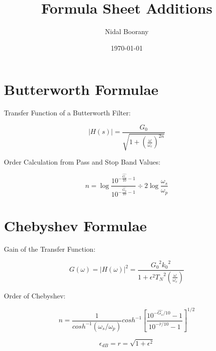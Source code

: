 \documentclass{article}
\begin{document}
\title{Formula Sheet Additions}
\author{Nidal Boorany}
\date{\today}
\maketitle

\section{Butterworth Formulae}
Transfer Function of a Butterworth Filter:

$$|H(s)| = \frac{G_0}{\sqrt{1 + (\frac{\omega}{\omega_c})^{2n}}}$$

Order Calculation from Pass and Stop Band Values:

$$n = \log{\frac{10^{- \frac{\hat{G_s}}{10} - 1}}{10^{- \frac{\hat{G_p}}{ 10} - 1}}} \div {2 \log{\frac{\omega_s}{\omega_p}}}$$

\section{Chebyshev Formulae}

Gain of the Transfer Function:

$$G(\omega) = |H(\omega)|^2 = \frac{{G_0}^2 {k_0}^2}{1 + {\epsilon}^2 {T_N}^2(\frac{\omega}{\omega_c})}$$

Order of Chebyshev:

$$n = \frac{1}{cosh^{-1}(\omega_{s}/\omega_{p})}cosh^{-1}\left[\frac{10^{-\hat{G_{s}}/10}-1}{10^{-\hat{r}/10}-1}\right]^{1/2}$$

$$\epsilon_{dB} = r = \sqrt{1 + \epsilon^{2}}$$
\end{document}
